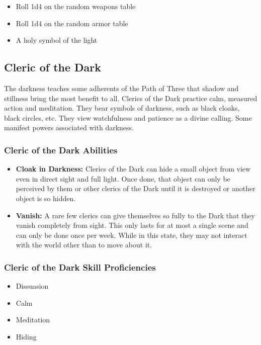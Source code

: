 \begin{multicols}{2}
\begin{itemize}
  \item Roll 1d4 on the random weapons table
  \item Roll 1d4 on the random armor table
  \item A holy symbol of the light
\end{itemize}

\subsection{Cleric of the Dark}

The darkness teaches some adherents of the Path of Three that shadow and stillness
bring the most benefit to all. Clerics of the Dark practice calm, measured
action and meditation. They bear symbols of darkness, such as black cloaks,
black circles, etc. They view watchfulness and patience as a divine calling.
Some manifest powers associated with darkness.

\subsubsection{Cleric of the Dark Abilities}

\begin{itemize}
  \item \textbf{Cloak in Darkness:} Clerics of the Dark can hide a small object
    from view even in direct sight and full light. Once done, that object can only
    be perceived by them or other clerics of the Dark until it is destroyed or
    another object is so hidden.
  \item \textbf{Vanish:} A rare few clerics can give themselves so fully to the
    Dark that they vanish completely from sight. This only lasts for at most a single
    scene and can only be done once per week. While in this state, they may not
    interact with the world other than to move about it.
\end{itemize}

\subsubsection{Cleric of the Dark Skill Proficiencies}

\begin{itemize}
  \item Dissuasion
  \item Calm
  \item Meditation
  \item Hiding
\end{itemize}


\end{multicols}
